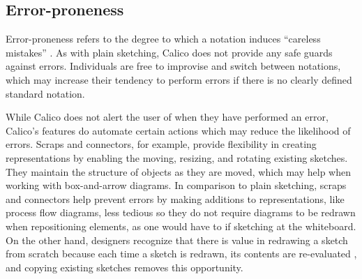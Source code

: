 
\subsection{Error-proneness}

Error-proneness refers to the degree to which a notation induces ``careless mistakes'' \cite{Petre2013BookChapter}. As with plain sketching, Calico does not provide any safe guards against errors. Individuals are free to improvise and switch between notations, which may increase their tendency to perform errors if there is no clearly defined standard notation. 

While Calico does not alert the user of when they have performed an error, Calico's features do automate certain actions which may reduce the likelihood of errors. Scraps and connectors, for example, provide flexibility in creating representations by enabling the moving, resizing, and rotating existing sketches. They maintain the structure of objects as they are moved, which may help when working with box-and-arrow diagrams. In comparison to plain sketching, scraps and connectors help prevent errors by making additions to representations, like process flow diagrams, less tedious so they do not require diagrams to be redrawn when repositioning elements, as one would have to if sketching at the whiteboard. On the other hand, designers recognize that there is value in redrawing a sketch from scratch because each time a sketch is redrawn, its contents are re-evaluated \cite{petre2009insights}, and copying existing sketches removes this opportunity.


